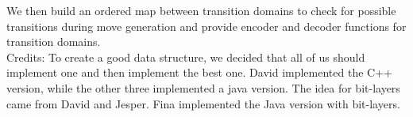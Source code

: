 \begin{center}
\end{center}
We then build an ordered map between transition domains to check for possible transitions during move generation and provide encoder and decoder functions for transition domains. \\
Credits: To create a good data structure, we decided that all of us should implement one and then implement the best one. David implemented 
the C++ version, while the other three implemented a java version. The idea for bit-layers came from David and Jesper. Fina implemented 
the Java version with bit-layers.